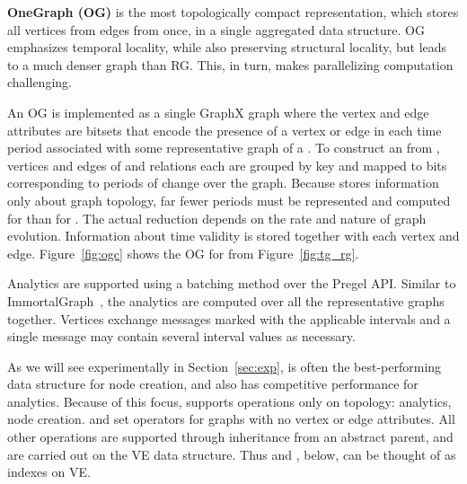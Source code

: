 {\bf OneGraph (OG)} is the most topologically compact representation,
which stores all vertices from  edges from \tae once, in
a single aggregated data structure.  OG emphasizes temporal locality,
while also preserving structural locality, but leads to a much denser
graph than RG.  This, in turn, makes parallelizing computation
challenging.

An OG is implemented as a single GraphX graph where the vertex and
edge attributes are bitsets that encode the presence of a vertex or
edge in each time period associated with some representative graph of
a \tg.  To construct an \og from \tve, vertices and edges of \tv and
\te relations each are grouped by key and mapped to bits corresponding
to periods of change over the graph.  Because \og stores information
only about graph topology, far fewer periods must be represented and
computed for \og than for \rg.  The actual reduction depends on the
rate and nature of graph evolution.  Information about time validity
is stored together with each vertex and edge.  Figure~\ref{fig:ogc}
shows the OG for  from Figure~\ref{fig:tg_rg}.

Analytics are supported using a batching method over the Pregel API.
Similar to ImmortalGraph~\cite{Miao2015}, the analytics are computed
over all the representative graphs together.  Vertices exchange
messages marked with the applicable intervals and a single message may
contain several interval values as necessary.

As we will see experimentally in Section~\ref{sec:exp}, \og is often
the best-performing data structure for node creation, and also has
competitive performance for analytics.  Because of this focus, \og
supports operations only on topology: analytics, node creation. and
set operators for graphs with no vertex or edge attributes.  All other
operations are supported through inheritance from an abstract parent,
and are carried out on the VE data structure.  Thus \og and \hg,
below, can be thought of as indexes on VE.


